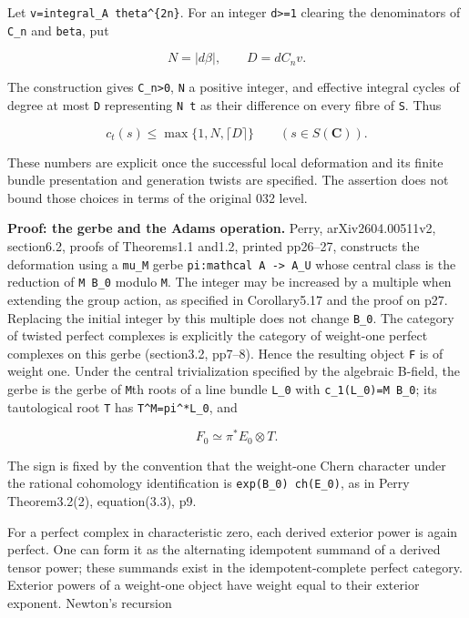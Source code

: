 \documentclass[11pt,a4paper]{article}
\theoremstyle{definition}
\begin{document}
Let \texttt{v=integral\_A\ theta\^{}\{2n\}}. For an integer
\texttt{d\textgreater{}=1} clearing the denominators of \texttt{C\_n}
and \texttt{beta}, put

\[
 N=|d\beta|,\qquad D=dC_n v.
\tag{DER4d}
\]

The construction gives \texttt{C\_n\textgreater{}0}, \texttt{N} a
positive integer, and effective integral cycles of degree at most
\texttt{D} representing \texttt{N\ t} as their difference on every fibre
of \texttt{S}. Thus

\[
 c_t(s)\le \max\{1,N,\lceil D\rceil\}\qquad(s\in S(\mathbf C)).
\tag{DER4e}
\]

These numbers are explicit once the successful local deformation and its
finite bundle presentation and generation twists are specified. The
assertion does not bound those choices in terms of the original 032
level.

\textbf{Proof: the gerbe and the Adams operation.} Perry,
arXiv2604.00511v2, section6.2, proofs of Theorems1.1 and1.2, printed
pp26--27, constructs the deformation using a \texttt{mu\_M} gerbe
\texttt{pi:mathcal\ A\ -\textgreater{}\ A\_U} whose central class is the
reduction of \texttt{M\ B\_0} modulo \texttt{M}. The integer may be
increased by a multiple when extending the group action, as specified in
Corollary5.17 and the proof on p27. Replacing the initial integer by
this multiple does not change \texttt{B\_0}. The category of twisted
perfect complexes is explicitly the category of weight-one perfect
complexes on this gerbe (section3.2, pp7--8). Hence the resulting object
\texttt{F} is of weight one. Under the central trivialization specified
by the algebraic B-field, the gerbe is the gerbe of \texttt{M}th roots
of a line bundle \texttt{L\_0} with \texttt{c\_1(L\_0)=M\ B\_0}; its
tautological root \texttt{T} has \texttt{T\^{}M=pi\^{}*L\_0}, and

\[
 F_0\simeq \pi^*E_0\otimes T.
\]

The sign is fixed by the convention that the weight-one Chern character
under the rational cohomology identification is
\texttt{exp(B\_0)\ ch(E\_0)}, as in Perry Theorem3.2(2), equation(3.3),
p9.

For a perfect complex in characteristic zero, each derived exterior
power is again perfect. One can form it as the alternating idempotent
summand of a derived tensor power; these summands exist in the
idempotent-complete perfect category. Exterior powers of a weight-one
object have weight equal to their exterior exponent. Newton's recursion
\end{document}
